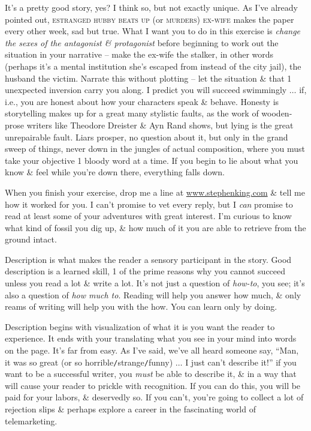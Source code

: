 \documentclass{article}
\numberwithin{equation}{section}
\begin{document}
It's a pretty good story, yes? I think so, but not exactly unique. As I've already pointed out, \textsc{estranged hubby beats up} (or \textsc{murders) ex-wife} makes the paper every other week, sad but true. What I want you to do in this exercise is \textit{change the sexes of the antagonist \& protagonist} before beginning to work out the situation in your narrative -- make the ex-wife the stalker, in other words (perhaps it's a mental institution she's escaped from instead of the city jail), the husband the victim. Narrate this without plotting -- let the situation \& that 1 unexpected inversion carry you along. I predict you will succeed swimmingly $\ldots$ if, i.e., you are honest about how your characters speak \& behave. Honesty is storytelling makes up for a great many stylistic faults, as the work of wooden-prose writers like Theodore Dreister \& Ayn Rand shows, but lying is the great unrepairable fault. Liars prosper, no question about it, but only in the grand sweep of things, never down in the jungles of actual composition, where you must take your objective 1 bloody word at a time. If you begin to lie about what you know \& feel while you're down there, everything falls down.

When you finish your exercise, drop me a line at \url{www.stephenking.com} \& tell me how it worked for you. I can't promise to vet every reply, but I \textit{can} promise to read at least some of your adventures with great interest. I'm curious to know what kind of fossil you dig up, \& how much of it you are able to retrieve from the ground intact.

 Description is what makes the reader a sensory participant in the story. Good description is a learned skill, 1 of the prime reasons why you cannot succeed unless you read a lot \& write a lot. It's not just a question of \textit{how-to}, you see; it's also a question of \textit{how much to}. Reading will help you answer how much, \& only reams of writing will help you with the how. You can learn only by doing.

Description begins with visualization of what it is you want the reader to experience. It ends with your translating what you see in your mind into words on the page. It's far from easy. As I've said, we've all heard someone say, ``Man, it was so great (or so horrible{\tt/}strange{\tt/}funny) $\ldots$ I just can't describe it!'' if you want to be a successful writer, you \textit{must} be able to describe it, \& in a way that will cause your reader to prickle with recognition. If you can do this, you will be paid for your labors, \& deservedly so. If you can't, you're going to collect a lot of rejection slips \& perhaps explore a career in the fascinating world of telemarketing.
\end{document}

